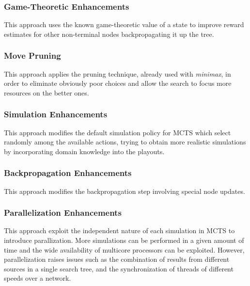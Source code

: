 \subsubsection{Game-Theoretic Enhancements}
This approach uses the known game-theoretic value of a state to improve reward estimates for other non-terminal nodes backpropagating it up the tree.

\subsubsection{Move Pruning}
This approach applies the pruning technique, already used with \textit{minimax}, in order to eliminate obviously poor choices and allow the search to focus more resources on the better ones.

\subsubsection{Simulation Enhancements}
This approach modifies the default simulation policy for MCTS which select randomly among the available actions, trying to obtain more realistic simulations by incorporating domain knowledge into the playouts.

\subsubsection{Backpropagation Enhancements}
This approach modifies the backpropagation step involving special node updates.

\subsubsection{Parallelization Enhancements}
This approach exploit the independent nature of each simulation in MCTS to introduce parallization. More simulations can be performed in a given amount of time and the wide availability of multicore processors can be exploited. However, parallelization raises issues such as the combination of results from different sources in a single search tree, and the synchronization of threads of different speeds over a network.

